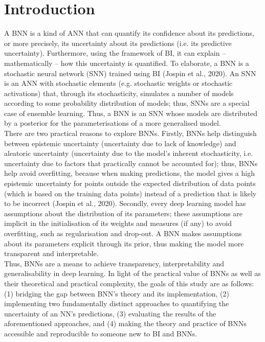 \documentclass[conference]{IEEEtran}
\begin{document}
\section{Introduction}
A BNN is a kind of ANN that can quantify its confidence about its predictions, or more precisely, its uncertainty about its predictions (i.e. its predictive uncertainty). Furthermore, using the framework of BI, it can explain – mathematically – how this uncertainty is quantified. To elaborate, a BNN is a stochastic neural network (SNN) trained using BI (Jospin et al., 2020). An SNN is an ANN with stochastic elements (e.g. stochastic weights or stochastic activations) that, through its stochasticity, simulates a number of models according to some probability distribution of models; thus, SNNs are a special case of ensemble learning. Thus, a BNN is an SNN whose models are distributed by a posterior for the parameterisations of a more generalised model.\\

There are two practical reasons to explore BNNs. Firstly, BNNs help distinguish between epistemic uncertainty (uncertainty due to lack of knowledge) and aleatoric uncertainty (uncertainty due to the model's inherent stochasticity, i.e. uncertainty due to factors that practically cannot be accounted for); thus, BNNs help avoid overfitting, because when making predictions, the model gives a high epistemic uncertainty for points outside the expected distribution of data points (which is based on the training data points) instead of a prediction that is likely to be incorrect (Jospin et al., 2020). Secondly, every deep learning model has assumptions about the distribution of its parameters; these assumptions are implicit in the initialisation of its weights and measures (if any) to avoid overfitting, such as regularisation and drop-out. A BNN makes assumptions about its parameters explicit through its prior, thus making the model more transparent and interpretable.\\

Thus, BNNs are a means to achieve transparency, interpretability and generalisability in deep learning. In light of the practical value of BNNs as well as their theoretical and practical complexity, the goals of this study are as follows: (1) bridging the gap between BNN’s theory and its implementation, (2) implementing two fundamentally distinct approaches to quantifying the uncertainty of an NN's predictions, (3) evaluating the results of the aforementioned approaches, and (4) making the theory and practice of BNNs accessible and reproducible to someone new to BI and BNNs.\\
\end{document}
